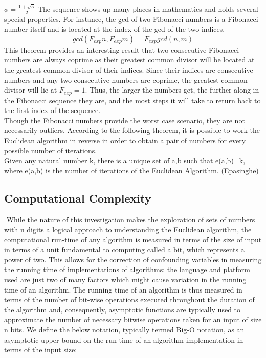 \documentclass[11pt]{article}
\begin{document}
$\phi = \frac{ 1 + \sqrt{5}}{2}$
       \indent The sequence shows up many places in mathematics and holds several special properties.  For instance, the gcd of two Fibonacci numbers is a Fibonacci number itself and is located at the index of the gcd of the two indices. 
\begin{equation} 
gcd(F_{exp}n,F_{exp}m) = F_{exp}gcd(n,m)
\end{equation}
\indent This theorem provides an interesting result that two consecutive Fibonacci numbers are always coprime as their greatest common divisor will be located at the greatest common divisor of their indices.  Since their indices are consecutive numbers and any two consecutive numbers are coprime, the greatest common divisor will lie at $F_{exp} = 1$.  Thus, the larger the numbers get, the further along in the Fibonacci sequence they are, and the most steps it will take to return back to the first index of the sequence.\\
\indent Though the Fibonacci numbers provide the worst case scenario, they are not necessarily outliers.  According to the following theorem, it is possible to work the Euclidean algorithm in reverse in order to obtain a pair of numbers for every possible number of iterations.  \\
\indent Given any natural number k, there is a unique set of a,b such that e(a,b)=k, where e(a,b) is the number of iterations of the Euclidean Algorithm.   (Epasinghe)

\subsection{Computational Complexity}$ $
\indent While the nature of this investigation makes the exploration of sets of numbers with n digits a logical approach to understanding the Euclidean algorithm, the computational run-time of any algorithm is measured in terms of the size of input in terms of a unit fundamental to computing called a bit, which represents a power of two. This allows for the correction of confounding variables in measuring the running time of implementations of algorithms: the language and platform used are just two of many factors which might cause variation in the running time of an algorithm. The running time of an algorithm is thus measured in terms of the number of bit-wise operations executed throughout the duration of the algorithm and, consequently, asymptotic functions are typically used to approximate the number of necessary bitwise operations taken for an input of size n bits. We define the below notation, typically termed Big-O notation, as an asymptotic upper bound on the run time of an algorithm implementation in terms of the input size:
\\
\end{document}
